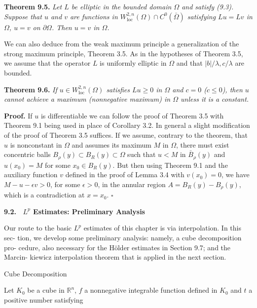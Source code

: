 \medskip

\textbf{Theorem 9.5.}
\emph{Let $L$ be elliptic in the bounded domain $\Omega$ and satisfy (9.3).
Suppose that $u$ and $v$ are functions in $W^{2,n}_{\mathrm{loc}}(\Omega)\cap C^0(\bar{\Omega})$ satisfying
$Lu = Lv$ in $\Omega$, $u = v$ on $\partial\Omega$. Then $u = v$ in $\Omega$.}

\medskip

We can also deduce from the weak maximum principle a generalization of the
strong maximum principle, Theorem 3.5. As in the hypotheses of Theorem 3.5, we
assume that the operator $L$ is uniformly elliptic in $\Omega$ and that $|b|/\lambda, c/\lambda$ are bounded.

\medskip

\textbf{Theorem 9.6.}
\emph{If $u \in W^{2,n}_{\mathrm{loc}}(\Omega)$ satisfies $Lu \geq 0$ in $\Omega$ and
$c = 0$ ($c \leq 0$), then $u$ cannot achieve a maximum (nonnegative maximum) in $\Omega$ unless
it is a constant.}

\medskip

\noindent\textbf{Proof.} If $u$ is differentiable we can follow the proof of Theorem 3.5 with Theorem
9.1 being used in place of Corollary 3.2. In general a slight modification of the proof
of Theorem 3.5 suffices. If we assume, contrary to the theorem, that $u$ is nonconstant
in $\Omega$ and assumes its maximum $M$ in $\Omega$, there must exist concentric balls
$B_\rho(y)\subset B_R(y)\subset \Omega$ such that $u < M$ in $\bar{B}_\rho(y)$ and $u(x_0)=M$ for some $x_0\in B_R(y)$.
But then using Theorem 9.1 and the auxiliary function $v$ defined in the proof of
Lemma 3.4 with $v(x_0)=0$, we have $M-u-\epsilon v>0$, for some $\epsilon>0$, in the annular
region $A=B_R(y)-B_\rho(y)$, which is a contradiction at $x=x_0$. \hfill$\square$

\medskip

\noindent\textbf{9.2. \ $L^p$ Estimates: Preliminary Analysis}

\medskip

Our route to the basic $L^p$ estimates of this chapter is via interpolation. In this sec-
tion, we develop some preliminary analysis: namely, a cube decomposition pro-
cedure, also necessary for the H\"older estimates in Section 9.7; and the Marcin-
kiewicz interpolation theorem that is applied in the next section.


Cube Decomposition

Let $K_0$ be a cube in $\mathbb{R}^n$, $f$ a nonnegative integrable function defined in $K_0$ and $t$ a positive number satisfying

